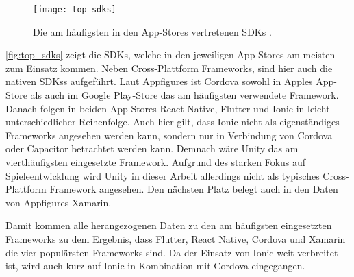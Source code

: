 \begin{figure}[ht]
  \centering
  \texttt{[image: top\_sdks]}
  \caption{Die am häufigsten in den App-Stores vertretenen \acp{SDK} \cite{Appfigures_TopSDKs}.}
  \label{fig:top_sdks}  
\end{figure}

\autoref{fig:top_sdks} zeigt die \acp{SDK}, welche in den jeweiligen App-Stores am meisten zum Einsatz kommen.
Neben Cross-Plattform Frameworks, sind hier auch die nativen \acp{SDKs} aufgeführt.
Laut Appfigures \cite{Appfigures_TopSDKs} ist Cordova sowohl in Apples App-Store als auch im Google Play-Store das am häufigsten verwendete Framework.
Danach folgen in beiden App-Stores React Native, Flutter und Ionic in leicht unterschiedlicher Reihenfolge.
Auch hier gilt, dass Ionic nicht als eigenständiges Frameworks angesehen werden kann, sondern nur in Verbindung von Cordova oder Capacitor betrachtet werden kann.
Demnach wäre Unity das am vierthäufigsten eingesetzte Framework.
Aufgrund des starken Fokus auf Spieleentwicklung \cite{Unity} wird Unity in dieser Arbeit allerdings nicht als typisches Cross-Plattform Framework angesehen.
Den nächsten Platz belegt auch in den Daten von Appfigures Xamarin.

Damit kommen alle herangezogenen Daten zu den am häufigsten eingesetzten Frameworks zu dem Ergebnis, dass Flutter, React Native, Cordova und Xamarin die vier populärsten Frameworks sind.
Da der Einsatz von Ionic weit verbreitet ist, wird auch kurz auf Ionic in Kombination mit Cordova eingegangen.





